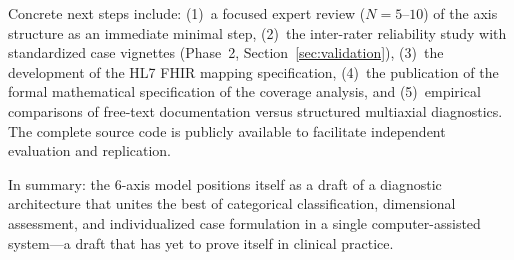 \documentclass[11pt,a4paper]{article}
\begin{document}
Concrete next steps include: (1)~a focused expert review ($N = 5$--$10$) of the axis structure as an immediate minimal step, (2)~the inter-rater reliability study with standardized case vignettes (Phase~2, Section~\ref{sec:validation}), (3)~the development of the HL7 FHIR mapping specification, (4)~the publication of the formal mathematical specification of the coverage analysis, and (5)~empirical comparisons of free-text documentation versus structured multiaxial diagnostics. The complete source code is publicly available to facilitate independent evaluation and replication.

In summary: the 6-axis model positions itself as a draft of a diagnostic architecture that unites the best of categorical classification, dimensional assessment, and individualized case formulation in a single computer-assisted system---a draft that has yet to prove itself in clinical practice.
\end{document}
